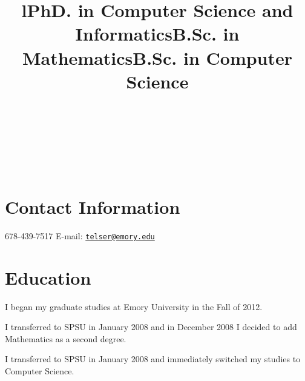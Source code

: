 \documentclass[margintitle,line]{res}
\begin{document}

\begin{resume}

\begin{format}
\\
\title{l}\\
\body\\
\end{format}



\section{Contact Information}

678-439-7517 \hfill {E-mail:} \href{mailto:telser@emory.edu}{\nolinkurl{telser@emory.edu}} \\


\section{Education}

\title{PhD. in Computer Science and Informatics}
\begin{position}
I began my graduate studies at Emory University in the Fall of 2012.
\end{position}

\title{B.Sc. in Mathematics}
\begin{position}
   I transferred to SPSU in January 2008 and in December 2008 I decided to add Mathematics as a second degree.
\end{position}

\title{B.Sc. in Computer Science}
\begin{position}
  I transferred to SPSU in January 2008 and immediately switched my studies to Computer Science.
\end{position}


\end{resume}
\end{document}
